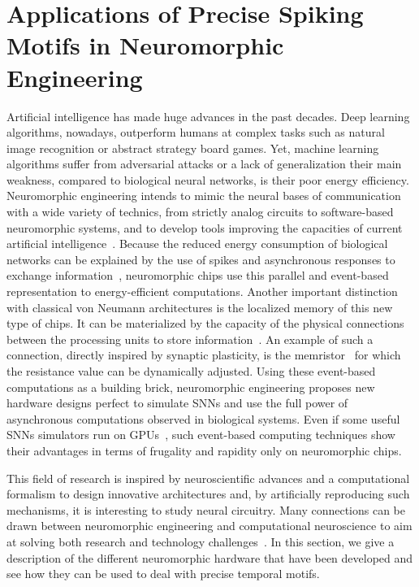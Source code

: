 \documentclass[brainsci, %
               review,accept,pdftex,moreauthors
               ]{Definitions/mdpi}
\begin{document}
\section{Applications of Precise Spiking Motifs in Neuromorphic Engineering}
\label{sec:neuromorphic}
%
Artificial intelligence has made huge advances in the past decades. Deep learning algorithms, nowadays, outperform humans at complex tasks such as natural image recognition or abstract strategy board games. Yet, machine learning algorithms suffer from adversarial attacks or a lack of generalization  their main weakness, compared to biological neural networks, is their poor energy efficiency. Neuromorphic engineering intends to mimic the neural bases of communication with a wide variety of technics, from strictly analog circuits to software-based neuromorphic systems, and to develop tools improving the capacities of current artificial intelligence~\citep{roy_towards_2019, javanshir_advancements_2022}. Because the reduced energy consumption of biological networks can be explained  by the use of spikes and asynchronous responses to exchange information~\citep{maass_networks_1997}, neuromorphic chips use this parallel and event-based representation to  energy-efficient computations. Another important distinction with classical von Neumann architectures is the localized memory of this new type of chips. It can be materialized by the capacity of the physical connections between the processing units to store information~\citep{markovic_physics_2020}. An example of such a connection, directly inspired by synaptic plasticity, is the memristor~\citep{rasetto_challenges_2022} for which the resistance value can be dynamically adjusted. Using these event-based computations as a building brick, neuromorphic engineering proposes new hardware designs perfect to simulate SNNs and use the full power of asynchronous computations observed in biological systems. Even if some useful SNNs simulators run on GPUs~\citep{diesmann_nest_2003, hazan_bindsnet_2018, stimberg_brian_2019}, such event-based computing techniques show their advantages in terms of frugality and rapidity only on neuromorphic chips. 

This field of research is inspired by neuroscientific advances and a computational formalism to design innovative architectures and, by artificially reproducing such mechanisms, it is interesting to study neural circuitry. Many connections can be drawn between neuromorphic engineering and computational neuroscience to aim at solving both research and technology challenges~\citep{zenke_visualizing_2021}. In this section, we give a description of the different neuromorphic hardware that have been developed and see how they can be used to deal with precise temporal motifs. 
%
\end{document}
